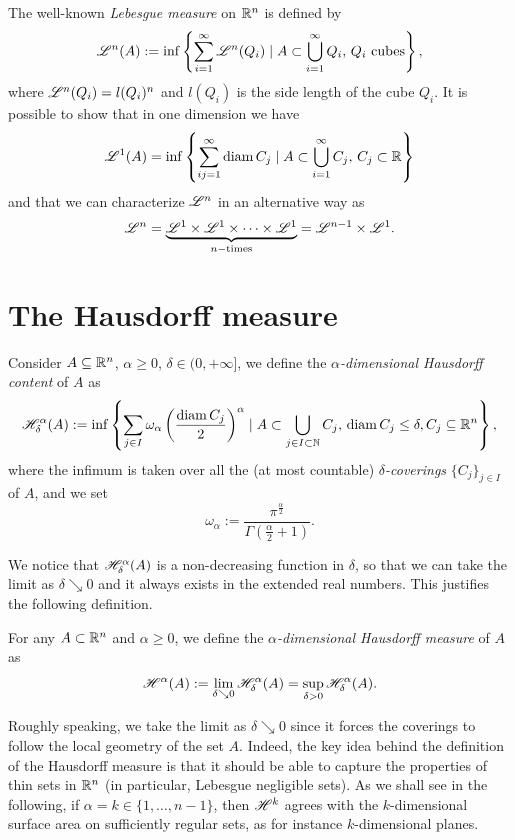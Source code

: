 \begin{example} 
The well-known \emph{Lebesgue measure} on $\mathbb{R}^{n}$ is defined by
\[
\mathscr{L}^{n}(A) := \inf \left\{\sum_{i=1}^\infty \mathscr{L}^{n}(Q_i) \mid A
\subset \bigcup_{i=1}^\infty Q_i,\, Q_i \text{ cubes}\right\},
\]
where $\mathscr{L}^{n}(Q_i) = l(Q_{i})^{n}$ and $l(Q_{i})$ is the side length of the cube $Q_i$. It is possible to show that in one dimension we have
\[
\mathscr{L}^{1}(A) = \inf \left\{ \sum_{ij=1}^\infty  \operatorname{diam} C_j \mid A
\subset \bigcup_{i=1}^\infty C_j, \, C_j \subset \mathbb{R} \right\}
\]
and that we can characterize $\mathscr{L}^{n}$ in an alternative way as
\[
\mathscr{L}^{n} = \underbrace{\mathscr{L}^{1}\times\mathscr{L}^{1} \times \dots \times \mathscr{L}^{1}}_{n-\text{times}} = \mathscr{L}^{n-1} \times \mathscr{L}^{1}.
\]
\end{example}


\section{The Hausdorff measure}

\begin{definition} Consider $A \subseteq \mathbb{R}^n$, $\alpha \geq 0$, $\delta \in (0,+\infty]$, we
define the \emph{$\alpha$-dimensional Hausdorff content} of $A$ as
\[
\mathscr{H}^{\alpha}_\delta(A) := \inf\left\{ \sum_{j\in I} \omega_\alpha
\left(\frac{\operatorname{diam} C_j}{2}\right)^\alpha \mid A \subset \bigcup_{j\in I \subset \mathbb{N}} C_j, \, \operatorname{diam}
C_j \leq \delta, C_j \subseteq \mathbb{R}^n \right\},
\]
where the infimum is taken over all the (at most countable) {\em $\delta$-coverings} $\{C_j\}_{j\in I}$ of $A$, and we set $$\omega_\alpha :=
\frac{\pi^{\frac{\alpha}{2}}}{\Gamma\left(\frac{\alpha}{2}+1\right)}.$$ 
\end{definition}

We notice that $\mathscr{H}^{\alpha}_\delta(A)$ is a non-decreasing function in $\delta$, so that we can take the limit as $\delta \searrow 0$ and it always exists in the extended real numbers. This justifies the following definition.

\begin{definition}
For any $A \subset \mathbb{R}^{n}$ and $\alpha \ge 0$, we define the \emph{$\alpha$-dimensional Hausdorff measure} of $A$ as 
\[
\mathscr{H}^{\alpha}(A) := \lim_{\delta \searrow 0} \mathscr{H}^{\alpha}_\delta (A) =
\sup_{\delta > 0} \mathscr{H}^{\alpha}_\delta(A).
\]
\end{definition}

Roughly speaking, we take the limit as $\delta \searrow 0$ since it forces the coverings to follow the local geometry of the set $A$. Indeed, the key idea behind the definition of the Hausdorff measure is that it should be able to capture the properties of thin sets in $\mathbb{R}^{n}$ (in particular, Lebesgue negligible sets). As we shall see in the following, if $\alpha = k \in \{ 1, \dots , n - 1\}$, then $\mathscr{H}^{k}$ agrees with the $k$-dimensional surface area on sufficiently regular sets, as for instance $k$-dimensional planes.

